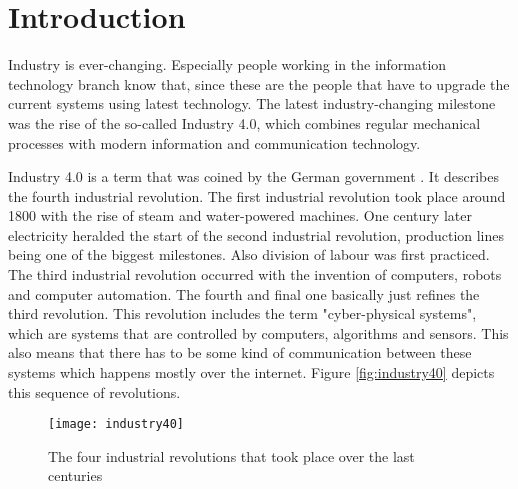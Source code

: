 \chapter{Introduction}
\label{ch:Introduction}




Industry is ever-changing. Especially people working in the information technology branch know that, since these are the people that have to upgrade the current systems using latest technology. The latest industry-changing milestone was the rise of the so-called Industry 4.0, which combines regular mechanical processes with modern information and communication technology.

Industry 4.0 is a term that was coined by the German government \autocite{Industrie4.0Paper}. It describes the fourth industrial revolution. The first industrial revolution took place around 1800 with the rise of steam and water-powered machines. One century later electricity heralded the start of the second industrial revolution, production lines being one of the biggest milestones. Also division of labour was first practiced. The third industrial revolution occurred with the invention of computers, robots and computer automation. The fourth and final one basically just refines the third revolution. This revolution includes the term "cyber-physical systems", which are systems that are controlled by computers, algorithms and sensors. This also means that there has to be some kind of communication between these systems which happens mostly over the internet. Figure \vref{fig:industry40} depicts this sequence of revolutions.


\begin{figure}[H]
    \centering
    \texttt{[image: industry40]}
    \caption[The four industrial revolutions that took place over the last centuries]{The four industrial revolutions that took place over the last centuries\footnotemark}
    \label{fig:industry40}
\end{figure}

